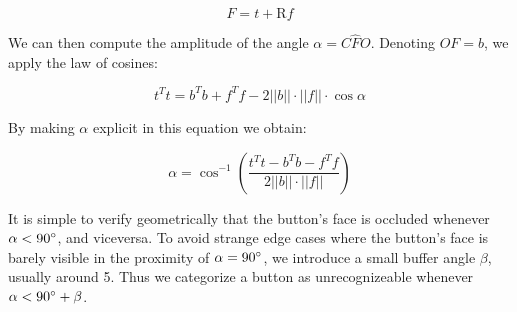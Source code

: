 \begin{equation*}
    F = t + \text{R}f
\end{equation*}

We can then compute the amplitude of the angle $\alpha = C\hat{F}O$. Denoting $OF=b$, we apply the law of cosines:

\begin{equation*}
    t^Tt = b^Tb + f^Tf -  2||b||\cdot ||f|| \cdot \cos \alpha
\end{equation*}

By making $\alpha$ explicit in this equation we obtain:

\begin{equation*}
    \alpha = \cos^{-1}\left(\frac{t^Tt- b^Tb-f^Tf}{2||b||\cdot||f||}\right)
\end{equation*}

It is simple to verify geometrically that the button's face is occluded whenever $\alpha < 90\degree$, and viceversa. To avoid strange edge cases where the button's face is barely visible in the proximity of $\alpha = 90\degree$, we introduce a small buffer angle $\beta$, usually around 5\degree. Thus we categorize a button as unrecognizeable whenever $\alpha < 90\degree + \beta$.